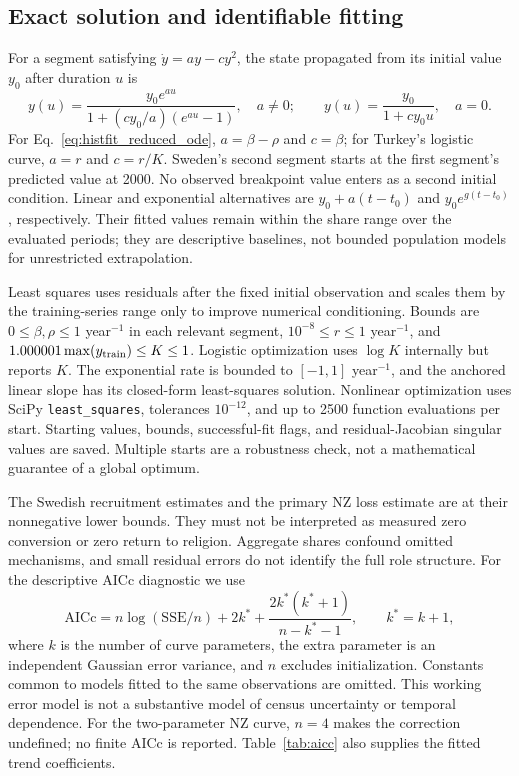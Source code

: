 \subsection{Exact solution and identifiable fitting}
For a segment satisfying $\dot y=a y-cy^2$, the state propagated from its initial value $y_0$ after duration $u$ is
\begin{equation}
y(u)=\frac{y_0e^{au}}{1+(cy_0/a)(e^{au}-1)},\quad a\ne0;
\qquad y(u)=\frac{y_0}{1+cy_0u},\quad a=0.
\end{equation}
For Eq.~\eqref{eq:histfit_reduced_ode}, $a=\beta-\rho$ and $c=\beta$; for Turkey's logistic curve, $a=r$ and $c=r/K$. Sweden's second segment starts at the first segment's predicted value at 2000. No observed breakpoint value enters as a second initial condition. Linear and exponential alternatives are $y_0+a(t-t_0)$ and $y_0e^{g(t-t_0)}$, respectively. Their fitted values remain within the share range over the evaluated periods; they are descriptive baselines, not bounded population models for unrestricted extrapolation.

Least squares uses residuals after the fixed initial observation and scales them by the training-series range only to improve numerical conditioning. Bounds are $0\leq\beta,\rho\leq1$ year$^{-1}$ in each relevant segment, $10^{-8}\leq r\leq1$ year$^{-1}$, and $1.000001\max(y_{\rm train})\leq K\leq1$. Logistic optimization uses $\log K$ internally but reports $K$. The exponential rate is bounded to $[-1,1]$ year$^{-1}$, and the anchored linear slope has its closed-form least-squares solution. Nonlinear optimization uses SciPy \texttt{least\_squares}, tolerances $10^{-12}$, and up to 2500 function evaluations per start. Starting values, bounds, successful-fit flags, and residual-Jacobian singular values are saved. Multiple starts are a robustness check, not a mathematical guarantee of a global optimum.

The Swedish recruitment estimates and the primary NZ loss estimate are at their nonnegative lower bounds. They must not be interpreted as measured zero conversion or zero return to religion. Aggregate shares confound omitted mechanisms, and small residual errors do not identify the full role structure. For the descriptive AICc diagnostic we use
\begin{equation}
\mathrm{AICc}=n\log(\mathrm{SSE}/n)+2k^*+
\frac{2k^*(k^*+1)}{n-k^*-1},\qquad k^*=k+1,
\end{equation}
where $k$ is the number of curve parameters, the extra parameter is an independent Gaussian error variance, and $n$ excludes initialization. Constants common to models fitted to the same observations are omitted. This working error model is not a substantive model of census uncertainty or temporal dependence. For the two-parameter NZ curve, $n=4$ makes the correction undefined; no finite AICc is reported. Table~\ref{tab:aicc} also supplies the fitted trend coefficients.



